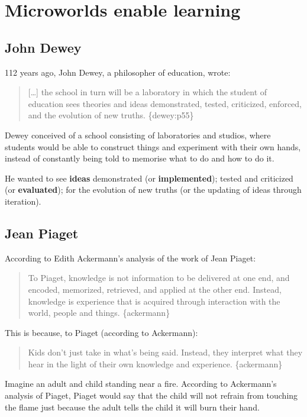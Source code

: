 \section{Microworlds enable learning}

\subsection{John Dewey}

112 years ago, John Dewey, a philosopher of education, wrote:

\begin{quote}
{[}\ldots{}{]} the school in turn will be a laboratory in which the
student of education sees theories and ideas demonstrated, tested,
criticized, enforced, and the evolution of new truths. \{dewey:p55\}
\end{quote}

Dewey conceived of a school consisting of laboratories and studios,
where students would be able to construct things and experiment with
their own hands, instead of constantly being told to memorise what to do
and how to do it.

He wanted to see \textbf{ideas} demonstrated (or \textbf{implemented});
tested and criticized (or \textbf{evaluated}); for the evolution of new
truths (or the updating of ideas through iteration).

\subsection{Jean Piaget}

According to Edith Ackermann's analysis of the work of Jean Piaget:

\begin{quote}
To Piaget, knowledge is not information to be delivered at one end, and
encoded, memorized, retrieved, and applied at the other end. Instead,
knowledge is experience that is acquired through interaction with the
world, people and things. \{ackermann\}
\end{quote}

This is because, to Piaget (according to Ackermann):

\begin{quote}
Kids don't just take in what's being said. Instead, they interpret what
they hear in the light of their own knowledge and experience.
\{ackermann\}
\end{quote}

Imagine an adult and child standing near a fire. According to
Ackermann's analysis of Piaget, Piaget would say that the child will not
refrain from touching the flame just because the adult tells the child
it will burn their hand.

